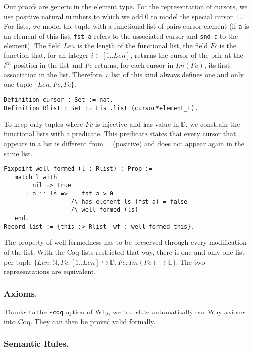 \documentclass[runningheads,a4paper]{llncs}
\newcommand{\Fc}{\ensuremath{\mathit{Fc}}\xspace}
\newcommand{\Fe}{\ensuremath{\mathit{Fe}}\xspace}
\newcommand{\typL}{\ensuremath{\{\Len,\Fc,\Fe\}}\xspace}
\newcommand{\ImFc}{\ensuremath{\mathit{Im}(\Fc)}\xspace}
\newcommand{\TypE}{\ensuremath{\mathbb{E}}\xspace}
\newcommand{\TypD}{\ensuremath{\mathbb{D}}\xspace}
\newcommand{\Nat}{\ensuremath{\mathbb{N}}\xspace}
\newcommand{\Len}{\ensuremath{\mathit{Len}}\xspace}
\begin{document}
Our proofs are generic in the element type. For the representation of cursors, we use positive natural
numbers to which we add 0 to model the special cursor $\bot$.
For lists, we model the tuple with a functional list of pairs cursor-element (if \verb|a| is an element of this list, \verb|fst a| refers to the associated cursor
and \verb|snd a| to the element). The field $\Len$ is the length of the
functional list, the field $\Fc$ is the function that, for an integer $i\in[1..\Len]$, returns the cursor of the pair at the $i^{th}$ position
in the list and $\Fe$ returns, for each cursor in $\ImFc$, its first association in the list. Therefore, a list of this kind always defines one and only one
tuple $\typL$.
\begin{lstlisting}
Definition cursor : Set := nat.
Definition Rlist : Set := List.list (cursor*element_t).
\end{lstlisting}
To keep only tuples where $\Fc$ is injective and has value in $\TypD$, we constrain the functional lists with a predicate.
This predicate states that every cursor that appears in a list is different from $\bot$ (positive) and does not appear again in the same list.
\begin{lstlisting}
Fixpoint well_formed (l : Rlist) : Prop :=
   match l with
        nil => True
      | a :: ls =>    fst a > 0
                   /\ has_element ls (fst a) = false
                   /\ well_formed (ls)
   end.
Record list := {this :> Rlist; wf : well_formed this}.
\end{lstlisting}
The property of well formedness has to be preserved through every modification of the list. With the Coq lists restricted that
way, there is one and only one list per tuple $\{\Len: \Nat, \Fc : [1 .. \Len] \hookrightarrow \TypD, \Fe : \ImFc
\rightarrow \TypE\}$. The two representations are equivalent.

\subsubsection{Axioms.}
Thanks to the \texttt{-coq} option of Why, we translate automatically our Why
axioms into Coq. They can then be proved valid formally.

\subsubsection{Semantic Rules.}
\end{document}
